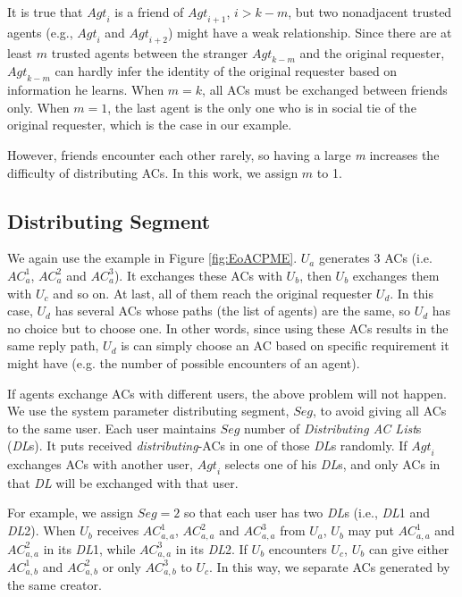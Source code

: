 It is true that ${Agt}_i$ is a friend of ${Agt}_{i+1}$, $i>k-m$, but two nonadjacent trusted agents (e.g., ${Agt}_i$ and ${Agt}_{i+2}$) might have a weak relationship. Since there are at least $m$ trusted agents between the stranger ${Agt}_{k-m}$ and the original requester, ${Agt}_{k-m}$ can hardly infer the identity of the original requester based on information he learns. When $m=k$, all ACs must be exchanged between friends only. When $m=1$, the last agent is the only one who is in social tie of the original requester, which is the case in our example.

However, friends encounter each other rarely, so having a large \textit{m} increases the difficulty of distributing ACs. In this work, we assign $m$ to 1.



\subsection{ Distributing Segment}

\noindent We again use the example in Figure \ref{fig:EoACPME}. $U_a$ generates 3 ACs (i.e. ${AC}^1_a$, ${AC}^2_a$ and ${AC}^3_a$). It exchanges these ACs with $U_b$, then $U_b$ exchanges them with $U_c$ and so on. At last, all of them reach the original requester $U_d$. In this case, $U_d$ has several ACs whose paths (the list of agents) are the same, so $U_d$ has no choice but to choose one. In other words, since using these ACs results in the same reply path, $U_d$ is can simply choose an AC based on specific requirement it might have (e.g. the number of possible encounters of an agent). 

If agents exchange ACs with different users, the above problem will not happen. We use the system parameter distributing segment, $Seg$, to avoid giving all ACs to the same user. Each user maintains $Seg$ number of \textit{Distributing AC List}s (\textit{DL}s). It puts received \textit{distributing}-ACs in one of those \textit{DL}s randomly. If ${Agt}_i$ exchanges ACs with another user, ${Agt}_i$ selects one of his \textit{DL}s, and only ACs in that \textit{DL} will be exchanged with that user.

For example, we assign $Seg=2$ so that each user has two \textit{DL}s (i.e., \textit{DL}1 and \textit{DL}2). When $U_b$ receives ${AC}^1_{a,a}$, ${AC}^2_{a,a}$ and ${AC}^3_{a,a}$ from $U_a$, $U_b$ may put ${AC}^1_{a,a}$ and ${AC}^2_{a,a}$ in its \textit{DL}1, while ${AC}^3_{a,a}$ in its \textit{DL}2. If $U_b$ encounters $U_c$, $U_b$ can give either ${AC}^1_{a,b}$ and ${AC}^2_{a,b}$ or only ${AC}^3_{a,b}$ to $U_c$. In this way, we separate ACs generated by the same creator.


